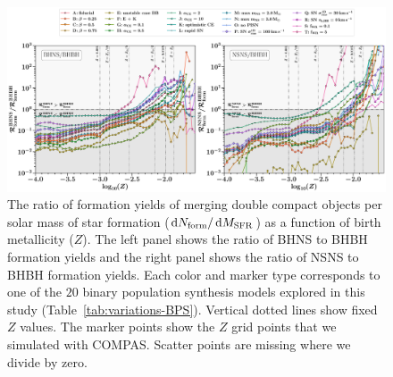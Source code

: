 \documentclass[fleqn,usenatbib]{mnras}
\newcommand{\Zi}{\ensuremath{Z}\xspace}
\newcommand{\MSFR}{\ensuremath{{M}_{\rm{SFR}}}\xspace}
\newcommand*\diff{\mathop{}\!\mathrm{d}}
\newcommand{\NmodelsBPS}{\ensuremath{20}\xspace}
\begin{document}
\begin{figure}
    \centering
%
\includegraphics[width=1.0\textwidth]{figures/FormationRatioRateAllModels3panels.pdf}
%
\caption{The ratio of formation yields of merging double compact objects per solar mass of star formation ($\diff N_{\rm{form}} / \diff \MSFR$) as a function of birth metallicity (\Zi). 
The left panel shows the ratio of BHNS to BHBH formation yields and the right panel shows the ratio of NSNS to BHBH formation yields.  Each color and marker type corresponds to one of the \NmodelsBPS binary population synthesis models explored in this study (Table~\ref{tab:variations-BPS}). 
Vertical dotted lines show fixed \Zi values. 
The marker points show the \Zi grid points that we simulated with COMPAS. Scatter points are missing where we divide by zero. \href{https://github.com/FloorBroekgaarden/Double-Compact-Object-Mergers/blob/main/plottingCode/Fig_1_and_Fig_A1/FormationRatioRateAllModels3panels.pdf}{\faFileImage} \href{https://github.com/FloorBroekgaarden/Double-Compact-Object-Mergers/blob/main/plottingCode/Fig_1_and_Fig_A1/make_Fig_1_and_Fig_A1.ipynb}{\faBook}} 
%
\label{fig:FormationRateDCO-Ratios-per-metallicity}
\end{figure}
%
\end{document}
